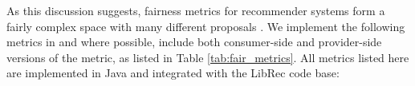 


As this discussion suggests, fairness metrics for recommender systems form a fairly complex space with many different proposals \cite{tsintzou2018bias,steck2018calibrated,beutel2019fairness,yao2017beyond,biega2018equity,castillo2019fairness,kuhlman2019fare,yang2017measuring}. We implement the following metrics in \libauto{} and where possible, include both consumer-side and provider-side versions of the metric, as listed in Table \ref{tab:fair_metrics}. All metrics listed here are implemented in Java and integrated with the LibRec code base: 

